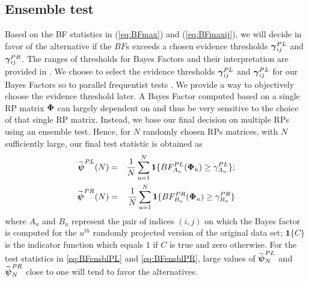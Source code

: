 \documentclass[times,sort&compress,3p]{elsarticle}
\theoremstyle{plain}%
\theoremstyle{definition}
\def\be{\begin{eqnarray}}
\def\ee{\end{eqnarray}}
\def\boldpsi{{\mbox{\boldmath $\psi$}}}
\def\bone{{\mathbf 1}}
\newcommand{\ugamma}            {\mbox{\boldmath$\gamma$}}
\newcommand{\uPhi}              {\mbox{\boldmath$\Phi$}}
\newcommand{\rsz}[1]{\textcolor{red}{#1}}
\begin{document}
\subsection{Ensemble test} \label{sec:testens}
Based on the BF statistics in (\ref{eq:BFmax}) and (\ref{eq:BFmaxij}), we will decide in favor of the alternative if the $BF$s exceeds a chosen evidence thresholds $\ugamma^{PL}_{ij}$ and $\ugamma^{PR}_{ij}$. 
The ranges of thresholds for Bayes Factors and their interpretation are provided in \cite{kass1995bayes}. We choose to select the evidence thresholds $\ugamma^{PL}_{ij}$ and $\ugamma^{PL}_{ij}$ for our Bayes Factors so to parallel frequentist tests \cite{johnson2013uniformly}. We provide a way to objectively choose the evidence threshold later. A Bayes Factor computed based on a single RP matrix $\uPhi$ can largely dependent on and thus be very sensitive to the choice of that single RP matrix. Instead, we base our final decision on multiple RPs using an ensemble test. Hence, for $N$ randomly chosen RPs matrices, with $N$ sufficiently large, our final test statistic is obtained as
\be
\widetilde{\boldpsi}^{PL}(N) &=& \frac{1}{N}\sum^{N}_{u=1} \bone\{ BF^{PL}_{A_u}(\uPhi_u) \geq \gamma^{PL}_{A_u}\}; \label{eq:BFensblPL}\\
\widetilde{\boldpsi}^{PR}(N) &=& \frac{1}{N}\sum^{N}_{u=1} \bone\{ BF^{PR}_{B_u}(\uPhi_u) \geq \gamma^{PR}_{B_u}\}  \label{eq:BFensblPR}
\ee
where $A_u$ and $B_u$ represent the pair of indices $(i,j)$ on which the Bayes factor is computed for the $u^{th}$ randomly projected version of the original data set; $\bone\{C\}$ is the indicator function which equals $1$ if $C$ is true and zero otherwise.
For the test statistics in \eqref{eq:BFensblPL} and \eqref{eq:BFensblPR}, large values of $\widetilde{\boldpsi}^{PL}_{N}$ and $\widetilde{\boldpsi}^{PR}_{N}$ close to one will tend to  favor the alternatives.
\end{document}
